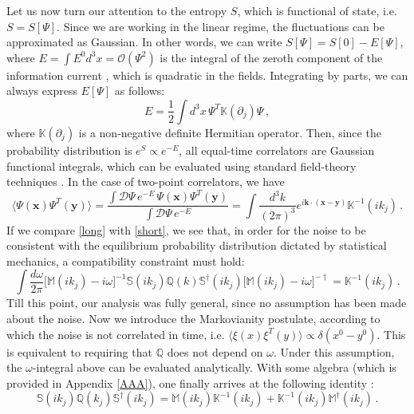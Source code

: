 \documentclass[a4paper, amsfonts, amssymb, amsmath, reprint, showkeys, nofootinbib, twoside,notitlepage,onecolumn]{revtex4-2}
\newcommand{\Ma}{{\mathbb{M}}}
\newcommand{\Sa}{{\mathbb{S}}}
\newcommand{\Qa}{{\mathbb{Q}}}
\newcommand{\Ka}{{\mathbb{K}}}
\newcommand{\x}{{\textbf{x}}}
\newcommand{\y}{{\textbf{y}}}
\newcommand{\kb}{{\textbf{k}}}
\theoremstyle{definition}
\begin{document}
Let us now turn our attention to the entropy $S$, which is functional of state, i.e. $S=S[\Psi]$. Since we are working in the linear regime, the fluctuations can be approximated as Gaussian. In other words, we can write $S[\Psi]=S[0]-E[\Psi]$, where $E=\int E^0 d^3 x=\mathcal{O}(\Psi^2)$ is the integral of the zeroth component of the information current \cite{GavassinoCausality2021}, which is quadratic in the fields. Integrating by parts, we can always express $E[\Psi]$ as follows:
\begin{equation}\label{Ewow}
    E = \dfrac{1}{2} \int d^3 x \, \Psi^T \Ka(\partial_j) \Psi \, ,
\end{equation}
where $\Ka(\partial_j)$ is a non-negative definite Hermitian operator. Then, since the probability distribution is $e^S \propto e^{-E}$, all equal-time correlators are Gaussian functional integrals, which can be evaluated using standard field-theory techniques \cite{weinbergQFT_1995}. In the case of two-point correlators, we have
\begin{equation}\label{short}
  \langle \Psi(\x) \Psi^T(\y)\rangle = \dfrac{\int \mathcal{D}\Psi \, e^{-E} \, \Psi(\x) \Psi^T(\y)}{\int \mathcal{D}\Psi \, e^{-E}} = \int \dfrac{d^3 k}{(2\pi)^3} e^{i \kb \cdot (\x-\y)} \Ka^{-1}(ik_j) \, . 
\end{equation}
If we compare \eqref{long} with \eqref{short}, we see that, in order for the noise to be consistent with the equilibrium probability distribution dictated by statistical mechanics, a compatibility constraint must hold:
\begin{equation}\label{eiught}
    \int \dfrac{d\omega}{2\pi} \big[\Ma(ik_j){-}i\omega\big]^{-1} \Sa(ik_j) \Qa(k) \Sa^\dagger(ik_j)\big[\Ma(ik_j){-}i\omega\big]^{-\dagger} = \Ka^{-1}(ik_j) \, .
\end{equation}
Till this point, our analysis was fully general, since no assumption has been made about the noise. Now we introduce the Markovianity postulate, according to which the noise is not correlated in time, i.e. $\langle \xi(x) \xi^T(y)\rangle \propto \delta(x^0-y^0)$. This is equivalent to requiring that $\Qa$ does not depend on $\omega$. Under this assumption, the $\omega$-integral above can be evaluated analytically. With some algebra (which is provided in Appendix \ref{AAA}), one finally arrives at the following identity \cite{FoxUhlFluctuations1970}:
\begin{equation}\label{nuine}
    \Sa(ik_j) \Qa(k_j) \Sa^\dagger(ik_j) = \Ma(ik_j)\Ka^{-1}(ik_j)+\Ka^{-1}(ik_j)\Ma^{\dagger}(ik_j) \, .
\end{equation}
\end{document}
